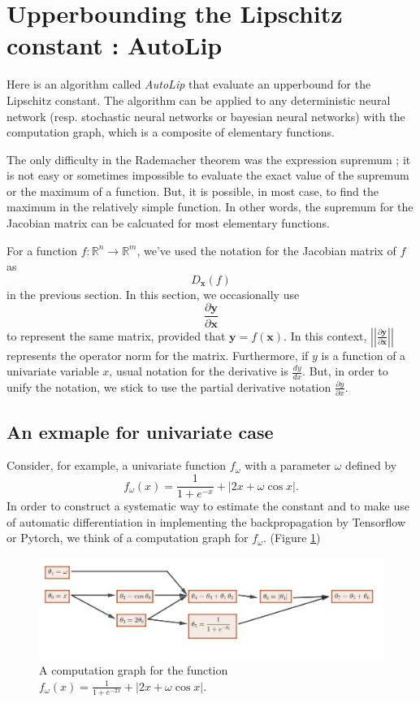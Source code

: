 \documentclass[12pt]{report}
\numberwithin{figure}{chapter}
\theoremstyle{plain}
\theoremstyle{definition}
\theoremstyle{corollary}
\theoremstyle{definition}
\theoremstyle{plain}
\theoremstyle{definition}
\theoremstyle{plain}
\begin{document}
\section{Upperbounding the Lipschitz constant : AutoLip}

Here is an algorithm called \emph{AutoLip} that evaluate an upperbound for the Lipschitz constant.
The algorithm can be applied to any deterministic neural network (resp. stochastic neural networks or bayesian neural networks) with the computation graph, which is a composite of elementary functions.

The only difficulty in the Rademacher theorem was the expression supremum ; it is not easy or sometimes impossible to evaluate the exact value of the supremum or the maximum of a function.
But, it is possible, in most case, to find the maximum in the relatively simple function.
In other words, the supremum for the Jacobian matrix can be calcuated for most elementary functions.

For a function \(f:\mathbb R^n\to\mathbb R^m\), we've used the notation for the Jacobian matrix of \(f\) as
\[D_{\boldsymbol x}(f)\]
in the previous section.
In this section, we occasionally use
\[\frac{\partial\boldsymbol y}{\partial\boldsymbol x}\]
to represent the same matrix, provided that \(\boldsymbol y=f(\boldsymbol x)\).
In this context, \(\left|\left|\frac{\partial\boldsymbol y}{\partial\boldsymbol x}\right|\right|\) represents the operator norm for the matrix.
Furthermore, if \(y\) is a function of a univariate variable \(x\), usual notation for the derivative is \(\frac{dy}{dx}\).
But, in order to unify the notation, we stick to use the partial derivative notation \(\frac{\partial y}{\partial x}\).


\subsection{An exmaple for  univariate case}
Consider, for example, a univariate function \(f_\omega\) with a parameter \(\omega\) defined by
\[f_\omega(x) = \frac1{1+e^{-x}}+\left|2x+\omega\cos x\right|.\]
In order to construct a systematic way to estimate the constant and to make use of automatic differentiation in implementing the backpropagation by Tensorflow or Pytorch, we think of a computation graph for \(f_\omega\). (Figure \ref{computation_graph_1})

\begin{figure}[h]
\centering
\includegraphics[width=\textwidth]{computation_graph_1}
\caption{A computation graph for the function \(f_\omega(x)=\frac1{1+e^{-2x}}+\left|2x+\omega\cos x\right|.\)}
\label{computation_graph_1}
\end{figure}
\end{document}
